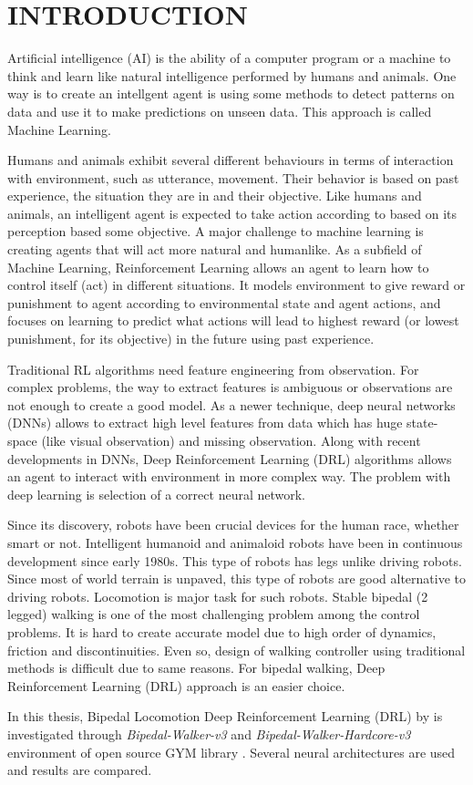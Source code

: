 \chapter{INTRODUCTION}
\label{chap:intro}

Artificial intelligence (AI) is the ability of a computer program or a machine to think and learn like natural intelligence performed by humans and animals.  One way is to create an intellgent agent is using some methods to detect patterns on data and use it to make predictions on unseen data. This approach is called Machine Learning. 

Humans and animals exhibit several different behaviours in terms of interaction with environment, such as utterance, movement. Their behavior is based on past experience, the situation they are in and their objective. Like humans and animals, an intelligent agent is expected to take action according to based on its perception based some objective. A major challenge to machine learning is creating agents that will act more natural and humanlike. As a subfield of Machine Learning, Reinforcement Learning allows an agent to learn how to control itself (act) in different situations. It models environment to give reward or punishment to agent according to environmental state and agent actions, and focuses on learning to predict what actions will lead to highest reward (or lowest punishment, for its objective) in the future using past experience.

Traditional RL algorithms need feature engineering from observation. For complex problems, the way to extract features is ambiguous or observations are not enough to create a good model. As a newer technique, deep neural networks (DNNs) allows to extract high level features from data which has huge state-space (like visual observation) and missing observation. Along with recent developments in DNNs, Deep Reinforcement Learning (DRL) algorithms allows an agent to interact with environment in more complex way. The problem with deep learning is selection of a correct neural network. 

Since its discovery, robots have been crucial devices for the human race, whether smart or not. Intelligent humanoid and animaloid robots have been in continuous development since early 1980s. This type of robots has legs unlike driving robots. Since most of world terrain is unpaved, this type of robots are good alternative to driving robots. Locomotion is major task for such robots. Stable bipedal (2 legged) walking is one of the most challenging problem among the control problems. It is hard to create accurate model due to high order of dynamics, friction and discontinuities. Even so, design of walking controller using traditional methods is difficult due to same reasons. For bipedal walking, Deep Reinforcement Learning (DRL) approach is an easier choice.

In this thesis, Bipedal Locomotion Deep Reinforcement Learning (DRL) by is investigated through \textit{Bipedal-Walker-v3} \cite{noauthor_bipedalwalker-v2_2021} and \textit{Bipedal-Walker-Hardcore-v3} \cite{noauthor_bipedalwalkerhardcore-v2_2021} environment of open source GYM library \cite{brockman_openai_2016}. Several neural architectures are used and results are compared. 